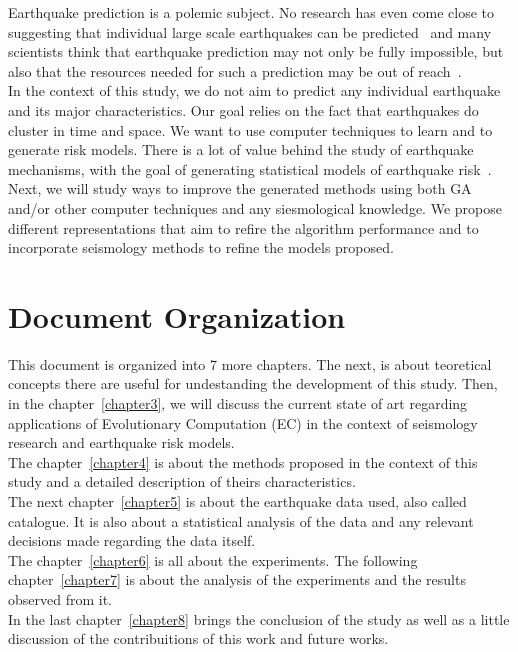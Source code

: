 Earthquake prediction is a polemic subject. No research has even come close to suggesting that individual large scale earthquakes can be predicted~\cite{ecta14} and many scientists think that earthquake prediction may not only be fully impossible, but also that the resources needed for such a prediction may be out of reach~\cite{eberhard2014multiscale}.\\

In the context of this study, we do not aim to predict any individual earthquake and its major characteristics. Our goal relies on the fact that earthquakes do cluster in time and space. We want to use computer techniques to learn and to generate risk models. There is a lot of value behind the study of earthquake mechanisms, with the goal of generating statistical models of earthquake risk~\cite{Nature1999}.\\

Next, we will study ways to improve the generated methods using both GA and/or other computer techniques and any siesmological knowledge. We propose different representations that aim to refire the algorithm performance and to incorporate seismology methods to refine the models proposed.\\

\section{Document Organization}

This document is organized into 7 more chapters. The next, is about teoretical concepts there are useful for undestanding the development of this study. Then, in the chapter~\ref{chapter3}, we will discuss the current state of art regarding applications of Evolutionary Computation (EC) in the context of seismology research and earthquake risk models. \\


The chapter~\ref{chapter4} is about the methods proposed in the context of this study and a detailed description of theirs characteristics.\\

The next chapter~\ref{chapter5} is about the earthquake data used, also called catalogue. It is also about a statistical analysis of the data and any relevant decisions made regarding the data itself.\\

The chapter~\ref{chapter6} is all about the experiments. The following chapter~\ref{chapter7} is about the analysis of the experiments and the results observed from it.\\

In the last chapter~\ref{chapter8} brings the conclusion of the study as well as a little discussion of the contribuitions of this work and future works.\\


